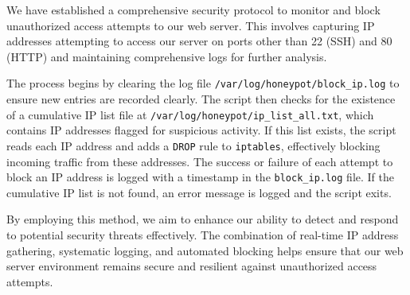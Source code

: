 We have established a comprehensive security protocol to monitor and block unauthorized access attempts to our web server. This involves capturing IP addresses attempting to access our server on ports other than 22 (SSH) and 80 (HTTP) and maintaining comprehensive logs for further analysis.

The process begins by clearing the log file \texttt{/var/log/honeypot/block_ip.log} to ensure new entries are recorded clearly. The script then checks for the existence of a cumulative IP list file at \texttt{/var/log/honeypot/ip_list_all.txt}, which contains IP addresses flagged for suspicious activity. If this list exists, the script reads each IP address and adds a \texttt{DROP} rule to \texttt{iptables}, effectively blocking incoming traffic from these addresses. The success or failure of each attempt to block an IP address is logged with a timestamp in the \texttt{block_ip.log} file. If the cumulative IP list is not found, an error message is logged and the script exits.

By employing this method, we aim to enhance our ability to detect and respond to potential security threats effectively. The combination of real-time IP address gathering, systematic logging, and automated blocking helps ensure that our web server environment remains secure and resilient against unauthorized access attempts.
